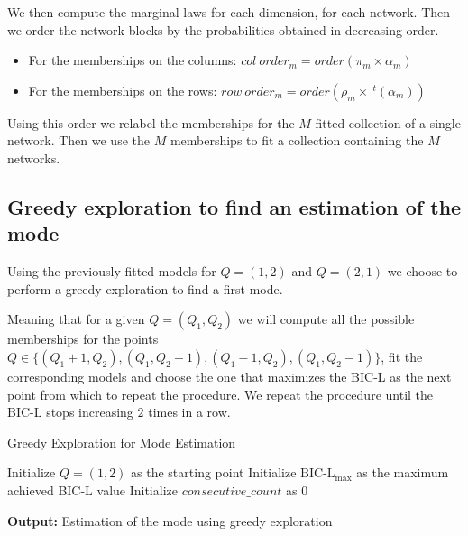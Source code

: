 \documentclass[12pt,a4paper]{report}
\begin{document}
We then compute the marginal laws for each dimension, for each network. Then
we order the network blocks by the probabilities obtained in decreasing order.
\begin{itemize}
    \item For the memberships on the columns:
          $col~order_m = order\left(\pi_m \times \alpha_m\right)$
    \item For the memberships on the rows:
          $row~order_m = order\left(\rho_m \times ~^{t}(\alpha_m)\right)$
\end{itemize}

Using this order we relabel the memberships for the $M$ fitted collection of a
single network.
Then we use the $M$ memberships to fit a collection containing the $M$ networks.
\subsection{Greedy exploration to find an estimation of the mode}
\label{ssec:greedy-exploration-to-find-an-estimation-of-the-mode}
Using the previously fitted models for $Q = (1,2)$ and $Q = (2,1)$ we choose to
perform a greedy exploration to find a first mode.

Meaning that for a given $Q = (Q_1, Q_2)$ we will compute all the possible
memberships for the points $Q \in \{(Q_1 + 1, Q_2),(Q_1, Q_2 + 1),(Q_1 - 1, Q_2),
    (Q_1, Q_2 - 1)\}$, fit
the corresponding models and choose the one that maximizes the BIC-L as the
next point from which to repeat the procedure. We repeat the procedure until the
BIC-L stops increasing $2$ times in a row.

\begin{algorithm}[H]
    \caption{Greedy Exploration for Mode Estimation}
    \SetAlgoLined


    \BlankLine
    Initialize $Q = (1,2)$ as the starting point
    Initialize $\text{BIC-L}_{\text{max}}$ as the maximum achieved BIC-L value
    Initialize $consecutive\_count$ as 0

    \BlankLine

    \BlankLine
    \textbf{Output:} Estimation of the mode using greedy exploration
\end{algorithm}
\end{document}
